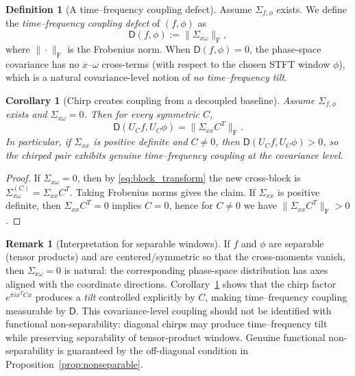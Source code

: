 \documentclass[final,1p,times,authoryear]{elsarticle}
\newtheorem{corollary}[theorem]{Corollary}
\theoremstyle{definition}
\newtheorem{definition}[theorem]{Definition}
\newtheorem{remark}[theorem]{Remark}
\newcommand{\1}{\mathbf{1}}
\begin{document}
\begin{definition}[A time--frequency coupling defect]\label{def:coupling_defect}
Assume $\Sigma_{f,\phi}$ exists. We define the \emph{time--frequency coupling defect} of $(f,\phi)$ as
$$
\mathsf D(f,\phi):=\|\Sigma_{x\omega}\|_{\mathrm{F}},
$$
where $\|\cdot\|_{\mathrm{F}}$ is the Frobenius norm.
When $\mathsf D(f,\phi)=0$, the phase-space covariance has no $x$--$\omega$ cross-terms
(with respect to the chosen STFT window $\phi$), which is a natural covariance-level notion of
\emph{no time--frequency tilt}.
\end{definition}

\begin{corollary}[Chirp creates coupling from a decoupled baseline]\label{cor:coupling_created}
Assume $\Sigma_{f,\phi}$ exists and $\Sigma_{x\omega}=0$.
Then for every symmetric $C$,
$$
\mathsf D(U_C f,U_C\phi)=\|\Sigma_{xx}C^T\|_{\mathrm{F}}.
$$
In particular, if $\Sigma_{xx}$ is positive definite and $C\neq 0$, then $\mathsf D(U_C f,U_C\phi)>0$,
so the chirped pair exhibits genuine time--frequency coupling at the covariance level.
\end{corollary}

\begin{proof}
If $\Sigma_{x\omega}=0$, then by \eqref{eq:block_transform} the new cross-block is
$\Sigma_{x\omega}^{(C)}=\Sigma_{xx}C^T$. Taking Frobenius norms gives the claim.
If $\Sigma_{xx}$ is positive definite, then $\Sigma_{xx}C^T=0$ implies $C=0$, hence for $C\neq 0$
we have $\|\Sigma_{xx}C^T\|_{\mathrm{F}}>0$.
\end{proof}

\begin{remark}[Interpretation for separable windows]\label{rem:separable_interpretation}
{If $f$ and $\phi$ are separable (tensor products) and are centered/symmetric so that the cross-moments vanish,
then $\Sigma_{x\omega}=0$ is natural: the corresponding phase-space distribution has axes aligned with the coordinate
directions. Corollary~\ref{cor:coupling_created} shows that the chirp factor $e^{\pi i x^TCx}$ produces a \emph{tilt}
controlled explicitly by $C$, making time--frequency coupling measurable by $\mathsf D$.
This covariance-level coupling should not be identified with functional non-separability: diagonal chirps may
produce time--frequency tilt while preserving separability of tensor-product windows. Genuine functional
non-separability is guaranteed by the off-diagonal condition in Proposition~\ref{prop:nonseparable}.}
\end{remark}
\end{document}

